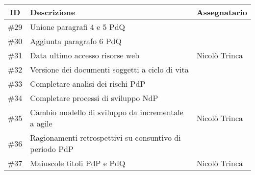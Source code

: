 \begin{center}
    \begin{tabular}{c|l|l}
        \rowcolor{pari_alt}
        \textbf{ID} & \textbf{Descrizione} & \textbf{Assegnatario} \\
        \midrule
        \#29 & Unione paragrafi 4 e 5 PdQ & \\
        \#30 & Aggiunta paragrafo 6 PdQ & \\
        \#31 & Data ultimo accesso risorse web & Nicolò Trinca \\
        \#32 & Versione dei documenti soggetti a ciclo di vita & \\
        \#33 & Completare analisi dei rischi PdP & \\
        \#34 & Completare processi di sviluppo NdP & \\
        \#35 & Cambio modello di sviluppo da incrementale a agile & Nicolò Trinca \\
        \#36 & Ragionamenti retrospettivi su consuntivo di periodo PdP & \\
        \#37 & Maiuscole titoli PdP e PdQ & Nicolò Trinca \\ 
    \end{tabular}
\end{center}